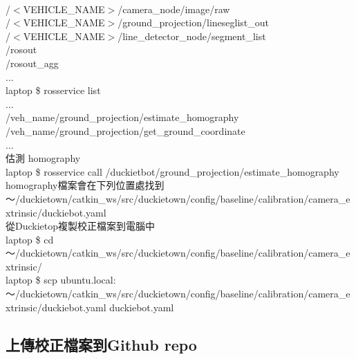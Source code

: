 \documentclass{article}
\begin{document}
\\/$<$VEHICLE\_NAME$>$/camera\_node/image/raw
\\/$<$VEHICLE\_NAME$>$/ground\_projection/lineseglist\_out
\\/$<$VEHICLE\_NAME$>$/line\_detector\_node/segment\_list
\\/rosout
\\/rosout\_agg
\\...
\\laptop \$ rosservice list
\\...
\\/veh\_name/ground\_projection/estimate\_homography
\\/veh\_name/ground\_projection/get\_ground\_coordinate
\\...
\\估測 homography
\\laptop \$ rosservice call /duckietbot/ground\_projection/estimate\_homography
\\homography檔案會在下列位置處找到
\\～/duckietown/catkin\_ws/src/duckietown/config/baseline/calibration/camera\_extrinsic/duckiebot.yaml
\\從Duckietop複製校正檔案到電腦中
\\laptop \$ cd ～/duckietown/catkin\_ws/src/duckietown/config/baseline/calibration/camera\_extrinsic/
\\laptop \$ scp ubuntu\@duckiebot.local:～/duckietown/catkin\_ws/src/duckietown/config/baseline/calibration/camera\_extrinsic/duckiebot.yaml duckiebot.yaml

\subsection{上傳校正檔案到Github repo}
\end{document}
